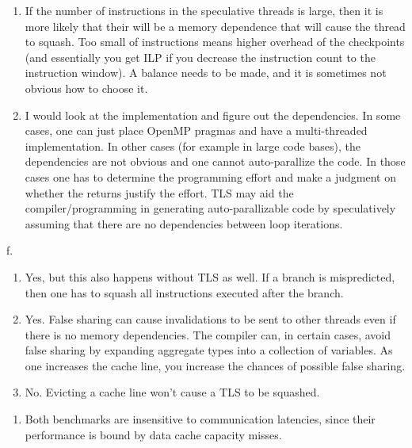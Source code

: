 \begin{enumerate}
\def\labelenumi{\alph{enumi}.}
\setcounter{enumi}{3}
\item
  If the number of instructions in the speculative threads is large,
  then it is more likely that their will be a memory dependence that
  will cause the thread to squash. Too small of instructions means
  higher overhead of the checkpoints (and essentially you get ILP if you
  decrease the instruction count to the instruction window). A balance
  needs to be made, and it is sometimes not obvious how to choose it.
\item
  I would look at the implementation and figure out the dependencies. In
  some cases, one can just place OpenMP pragmas and have a
  multi-threaded implementation. In other cases (for example in large
  code bases), the dependencies are not obvious and one cannot
  auto-parallize the code. In those cases one has to determine the
  programming effort and make a judgment on whether the returns justify
  the effort. TLS may aid the compiler/programming in generating
  auto-parallizable code by speculatively assuming that there are no
  dependencies between loop iterations.
\end{enumerate}

f.

\begin{enumerate}
\def\labelenumi{\arabic{enumi}.}
\item
  Yes, but this also happens without TLS as well. If a branch is
  mispredicted, then one has to squash all instructions executed after
  the branch.
\item
  Yes. False sharing can cause invalidations to be sent to other threads
  even if there is no memory dependencies. The compiler can, in certain
  cases, avoid false sharing by expanding aggregate types into a
  collection of variables. As one increases the cache line, you increase
  the chances of possible false sharing.
\item
  No. Evicting a cache line won't cause a TLS to be squashed.
\end{enumerate}

\begin{enumerate}
\def\labelenumi{\alph{enumi}.}
\setcounter{enumi}{6}
\itemsep1pt\parskip0pt
\item
  Both benchmarks are insensitive to communication latencies, since
  their performance is bound by data cache capacity misses.
\end{enumerate}

